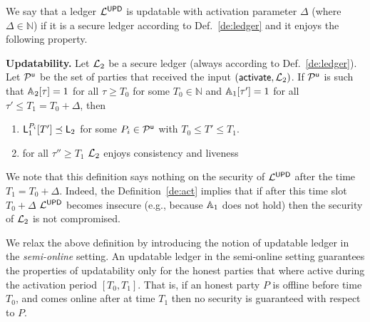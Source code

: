 \begin{definition}\label{de:act}
We say that a ledger $\mathcal{L}^\mathsf{UPD}$ is updatable with activation parameter $\Delta$ (where $\Delta\in\mathbb{N}$) if it is a secure ledger 
according to Def.~\ref{de:ledger} and it enjoys the following property.

{\bf Updatability.} Let $\mathcal{L}_2$ be a secure ledger (always according to Def.~\ref{de:ledger}).
Let $\mathcal{P}^\mathsf{u}$ be the set of parties that received the input $(\mathsf{activate}, \mathcal{L}_2)$. 
If $\mathcal{P}^\mathsf{u}$ is such that  $\mathbb{A}_2[\tau]=1$ for all $\tau\geq T_0$ for some $T_0\in\mathbb{N}$ and $\mathbb{A}_1[\tau']=1$ for all $\tau' \leq T_1=T_0 +\Delta$,  then
\begin{enumerate}
	\item $\mathsf{L}_1^{P_i}[T'] \preceq \mathsf{L}_2$ for some $P_i\in\mathcal{P}^\mathsf{u}$ with  $T_0\leq T' \leq T_1$.
	\item for all $\tau''\geq T_1$ $\mathcal{L}_2$ enjoys consistency and liveness
\end{enumerate}
\end{definition}



We note that this definition says nothing on the security of $\mathcal{L}^\mathsf{UPD}$ after the time $T_1=T_0+\Delta$. Indeed, the Definition~\ref{de:act} implies that if
after this time slot $T_0+\Delta$ $\mathcal{L}^\mathsf{UPD}$ becomes insecure (e.g., because $\mathbb{A}_1$ does not hold) then the security of $\mathcal{L}_2$ is not compromised.

We relax the above definition by introducing the notion of updatable ledger in the \emph{semi-online} setting.
An updatable ledger in the semi-online setting guarantees the properties of updatability 
only for the honest parties that where active during the activation period $[T_0,T_1]$. That is, if an honest party $P$ is offline before time $T_0$, and comes online after at time $T_1$ then no security is guaranteed with respect to $P$.



